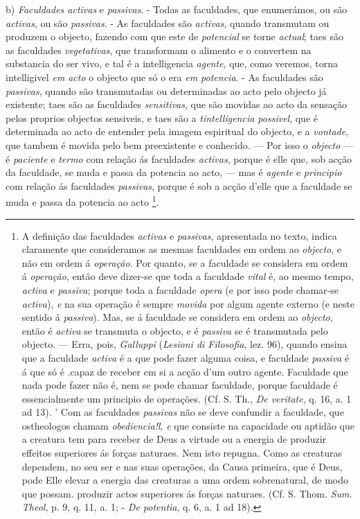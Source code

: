 b) \emph{Faculdades activas} e \emph{passivas}. - Todas as faculdades, que enumerámos, ou são \emph{activas}, ou são \emph{passivas}. - As faculdades são \emph{activas}, quando transmutam ou produzem o objecto, fazendo com que este de \emph{potencial} se torne \emph{actual}; taes são as faculdades \emph{vegetativas}, que transformam o alimento e o convertem na substancia do ser vivo, e tal é a intelligencia \emph{agente}, que, como veremos, torna intelligivel \emph{em acto} o objecto que só o era \emph{em potencia}. - As faculdades são \emph{passivas}, quando são transmutadas ou determinadas ao acto pelo objecto já existente; taes são as faculdades \emph{sensitivas}, que são movidas ao acto da sensação pelos proprios objectos sensiveis, e taes são a \emph{tintelligencia possivel}, que é determinada ao acto de entender pela imagem espiritual do objecto, e a \emph{vontade}, que tambem é movida pelo bem preexistente e conhecido. --- Por isso o \emph{objecto} --- é \emph{paciente} e \emph{termo} com relação ás faculdades \emph{activas}, porque é elle que, sob acção da faculdade, se muda e passa da potencia ao acto, --- mas é \emph{agente} e \emph{principio} com relação ás faculdades \emph{passivas}, porque é sob a acção d'elle que a faculdade se muda e passa da potencia ao acto \footnote{A definição das faculdades \emph{activas} e \emph{passivas}, apresentada no texto, indica claramente que consideramos as mesmas faculdades em ordem ao \emph{objecto}, e não em ordem á \emph{operação}. Por quanto, se a faculdade se considera em ordem á \emph{operação}, então deve dizer-se que toda a faculdade \emph{vital} é, ao mesmo tempo, \emph{activa} e \emph{passiva}; porque toda a faculdade \emph{opera} (e por isso pode chamar-se \emph{activa}), \emph{e} na sua operação é sempre \emph{movida} por algum agente externo (e neste sentido á \emph{passiva}). Mas, se á faculdade se considera em ordem ao \emph{objecto}, então é \emph{activa} se transmuta o objecto, e é \emph{passiva} se é transmutada pelo objecto. --- Erra, pois, \emph{Galluppi} (\emph{Lesioni di Filosofia}, lez. 96), quando ensina que a faculdade \emph{activa} é a que pode fazer alguma coisa, e faculdade \emph{passiva} é á que só é .capaz de receber em si a acção d'um outro agente. Faculdade que nada pode fazer não é, nem se pode chamar faculdade, porque faculdade é essencialmente um principio de operações. (Cf. S. Th., \emph{De veritate}, q. 16, a. 1 ad 13). ' Com as faculdades \emph{passivas} não se deve confundir a faculdade, que ostheologos chamam \emph{obediencia!l}, \emph{e} que consiste na capacidade ou aptidão que a creatura tem para receber de Deus a virtude ou a energia de produzir effeitos superiores ás forças naturaes. Nem isto repugna. Como as creaturas dependem, no seu ser e nas suas operações, da Causa primeira, que é Deus, pode Elle elevar a energia das creaturas a uma ordem sobrenatural, de modo que possam. produzir actos superiores ás forças naturaes. (Cf. S. Thom. \emph{Sum}. \emph{Theol}, p. 9, q. 11, a. 1; - \emph{De potentia}, q. 6, a. 1 ad 18).}.

